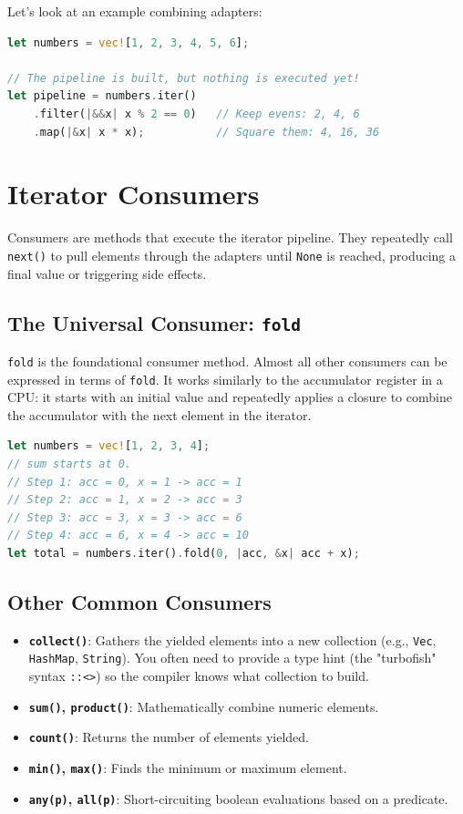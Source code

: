 Let's look at an example combining adapters:

\begin{lstlisting}[language=Rust]
let numbers = vec![1, 2, 3, 4, 5, 6];

// The pipeline is built, but nothing is executed yet!
let pipeline = numbers.iter()
    .filter(|&&x| x % 2 == 0)   // Keep evens: 2, 4, 6
    .map(|&x| x * x);           // Square them: 4, 16, 36
\end{lstlisting}

\section{Iterator Consumers}
Consumers are methods that execute the iterator pipeline. They repeatedly call \texttt{next()} to pull elements through the adapters until \texttt{None} is reached, producing a final value or triggering side effects.

\subsection{The Universal Consumer: \texttt{fold}}
\texttt{fold} is the foundational consumer method. Almost all other consumers can be expressed in terms of \texttt{fold}. It works similarly to the accumulator register in a CPU: it starts with an initial value and repeatedly applies a closure to combine the accumulator with the next element in the iterator.

\begin{lstlisting}[language=Rust]
let numbers = vec![1, 2, 3, 4];
// sum starts at 0. 
// Step 1: acc = 0, x = 1 -> acc = 1
// Step 2: acc = 1, x = 2 -> acc = 3
// Step 3: acc = 3, x = 3 -> acc = 6
// Step 4: acc = 6, x = 4 -> acc = 10
let total = numbers.iter().fold(0, |acc, &x| acc + x);
\end{lstlisting}

\subsection{Other Common Consumers}
\begin{itemize}
    \item \textbf{\texttt{collect()}}: Gathers the yielded elements into a new collection (e.g., \texttt{Vec}, \texttt{HashMap}, \texttt{String}). You often need to provide a type hint (the "turbofish" syntax \texttt{::<>}) so the compiler knows what collection to build.
    \item \textbf{\texttt{sum()}, \texttt{product()}}: Mathematically combine numeric elements.
    \item \textbf{\texttt{count()}}: Returns the number of elements yielded.
    \item \textbf{\texttt{min()}, \texttt{max()}}: Finds the minimum or maximum element.
    \item \textbf{\texttt{any(p)}, \texttt{all(p)}}: Short-circuiting boolean evaluations based on a predicate.
\end{itemize}

